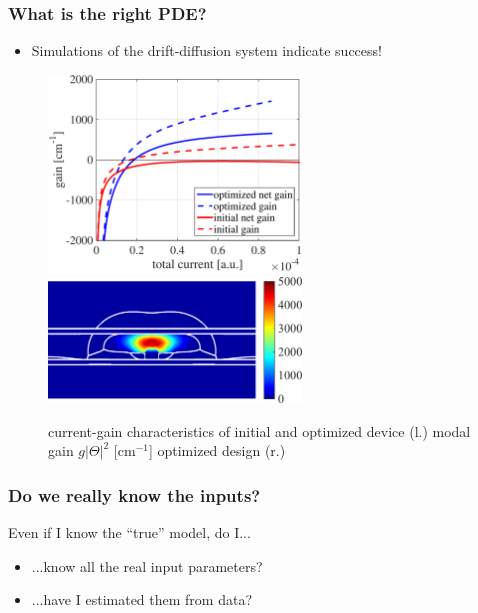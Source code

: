 \documentclass[aspectratio=169,xcolor=dvipsnames,10pt]{beamer}
\begin{document}
\begin{frame}\frametitle{What is the right PDE?}
\begin{example}
\begin{itemize}
\item Simulations of the drift-diffusion system indicate success! 
\end{itemize}
\begin{figure}
\qquad
\includegraphics[height=0.24\textwidth, width=0.6\textwidth, keepaspectratio]{Part I/figures/gain-1.pdf}\qquad
\includegraphics[height=0.24\textwidth, width=0.6\textwidth, keepaspectratio]{Part I/figures/gain_FINAL_new-1.png}%
\caption{
 current-gain characteristics  of initial and optimized device (l.) modal gain $g|\Theta|^2$ [cm$^{-1}$] optimized design (r.)}
\label{fig:gainsimulation}
\end{figure}
\end{example}
\end{frame}

\begin{frame}\frametitle{Do we \alert{really} know the inputs?}
\begin{exampleblock}{}
Even if I know the ``true'' model, do I...
\begin{itemize}
\item ...know all the real input parameters?
\item ...have I estimated them from data? 
\end{itemize}
\end{exampleblock}

\end{frame}
\end{document}
